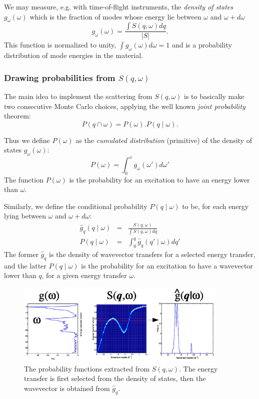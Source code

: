 We may measure, e.g. with time-of-flight instruments, the \emph{density of states} $g_{\omega}(\omega)$  which is the fraction of modes whose energy lie between $\omega$ and $\omega+d\omega$ \cite{lovesey84}
\begin{equation}
g_{\omega}(\omega) = \frac{\int S(q,\omega) dq}{|S|} .
\end{equation}
This function is normalized to unity, $\int g_{\omega}(\omega) d\omega = 1$ and is a probability distribution of mode energies in the material.

\subsubsection{Drawing probabilities from $S(q, \omega)$}

The main idea to implement the scattering from $S(q, \omega)$ is to basically make two consecutive Monte Carlo choices, applying the well known \emph{joint probability} theorem:
\begin{equation}
\label{eq:jointproba}
P(q \cap \omega) = P(\omega).P(q \mid \omega) .
\end{equation}

Thus we define $P(\omega)$ as the \emph{cumulated distribution} (primitive) of the density of states $g_{\omega}(\omega)$:
\begin{equation}\label{eq:Pw}
P(\omega) = \int_0^\omega g_{\omega}(\omega') d\omega'
\end{equation}
The function $P(\omega)$ is the probability for an excitation to have an energy lower than $\omega$.

Similarly, we define the conditional probability $P(q \mid \omega)$ to be, for each energy lying between $\omega$ and $\omega+d\omega$:
\begin{eqnarray}\label{eq:Pqw}
\hat g_q(q\mid\omega) &=& \frac{S(q, \omega)}{\int S(q,\omega) dq} \\
P(q \mid \omega)    &=& \int_0^q \hat g_q(q'\mid\omega) dq'
\end{eqnarray}
The former $\hat g_q$ is the density of wavevector transfers for a selected energy transfer, and the latter $P(q \mid \omega)$ is the probability for an excitation to have a wavevector lower than $q$, for a given energy transfer $\omega$.

\begin{figure}
  \begin{center}
    \includegraphics[width=0.9\textwidth]{figures/Sqw_sampling.eps}
  \end{center}
\caption{The probability functions extracted from $S(q,\omega)$. The energy transfer is first selected from the density of states, then the wavevector is obtained from $\hat g_q$.}
\label{f:isotropic-sqw}
\end{figure}


